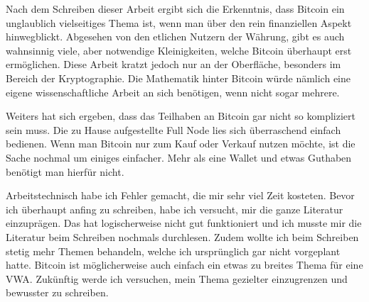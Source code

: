 Nach dem Schreiben dieser Arbeit ergibt sich die Erkenntnis, dass Bitcoin ein unglaublich vielseitiges
Thema ist, wenn man über den rein finanziellen Aspekt hinwegblickt. Abgesehen von den etlichen Nutzern
der Währung, gibt es auch wahnsinnig viele, aber notwendige Kleinigkeiten, welche Bitcoin überhaupt erst
ermöglichen. Diese Arbeit kratzt jedoch nur an der Oberfläche, besonders im Bereich der Kryptographie.
Die Mathematik hinter Bitcoin würde nämlich eine eigene wissenschaftliche Arbeit an sich benötigen, wenn
nicht sogar mehrere. 

Weiters hat sich ergeben, dass das Teilhaben an Bitcoin gar nicht so kompliziert sein muss. Die zu Hause
aufgestellte Full Node lies sich überraschend einfach bedienen. Wenn man Bitcoin nur zum Kauf oder Verkauf
nutzen möchte, ist die Sache nochmal um einiges einfacher. Mehr als eine Wallet und etwas Guthaben benötigt
man hierfür nicht.

Arbeitstechnisch habe ich Fehler gemacht, die mir sehr viel Zeit kosteten. Bevor ich überhaupt anfing zu
schreiben, habe ich versucht, mir die ganze Literatur einzuprägen. Das hat logischerweise nicht gut
funktioniert und ich musste mir die Literatur beim Schreiben nochmals durchlesen. Zudem wollte ich beim
Schreiben stetig mehr Themen behandeln, welche ich ursprünglich gar nicht vorgeplant hatte. Bitcoin ist
möglicherweise auch einfach ein etwas zu breites Thema für eine VWA. Zukünftig werde ich versuchen, mein 
Thema gezielter einzugrenzen und bewusster zu schreiben.
